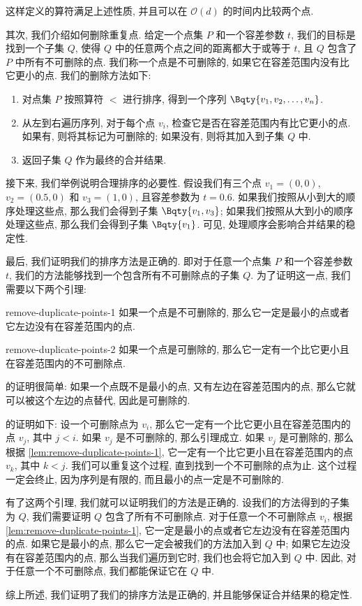 这样定义的算符满足上述性质, 并且可以在 $\mathcal{O}(d)$ 的时间内比较两个点.

其次, 我们介绍如何删除重复点.
给定一个点集 $P$ 和一个容差参数 $t$, 我们的目标是找到一个子集 $Q$, 使得 $Q$ 中的任意两个点之间的距离都大于或等于 $t$, 且 $Q$ 包含了 $P$ 中所有不可删除的点.
我们称一个点是不可删除的, 如果它在容差范围内没有比它更小的点.
我们的删除方法如下:
\begin{enumerate}
  \item 对点集 $P$ 按照算符 $<$ 进行排序, 得到一个序列 $\Bqty{v_1, v_2, \dots, v_n}$.
  \item 从左到右遍历序列, 对于每个点 $v_i$, 检查它是否在容差范围内有比它更小的点.
        如果有, 则将其标记为可删除的; 如果没有, 则将其加入到子集 $Q$ 中.
  \item 返回子集 $Q$ 作为最终的合并结果.
\end{enumerate}

接下来, 我们举例说明合理排序的必要性.
假设我们有三个点 $v_1 = (0, 0)$, $v_2 = (0.5, 0)$ 和 $v_3 = (1, 0)$, 且容差参数为 $t = 0.6$.
如果我们按照从小到大的顺序处理这些点, 那么我们会得到子集 $\Bqty{v_1, v_3}$; 如果我们按照从大到小的顺序处理这些点, 那么我们会得到子集 $\Bqty{v_1}$.
可见, 处理顺序会影响合并结果的稳定性.

最后, 我们证明我们的排序方法是正确的.
即对于任意一个点集 $P$ 和一个容差参数 $t$, 我们的方法能够找到一个包含所有不可删除点的子集 $Q$.
为了证明这一点, 我们需要以下两个引理:

\begin{lem}{}{remove-duplicate-points-1}
  如果一个点是不可删除的, 那么它一定是最小的点或者它左边没有在容差范围内的点.
\end{lem}

\begin{lem}{}{remove-duplicate-points-2}
  如果一个点是可删除的, 那么它一定有一个比它更小且在容差范围内的不可删除点.
\end{lem}

 的证明很简单:
如果一个点既不是最小的点, 又有左边在容差范围内的点, 那么它就可以被这个左边的点替代, 因此是可删除的.

 的证明如下:
设一个可删除点为 $v_i$, 那么它一定有一个比它更小且在容差范围内的点 $v_j$, 其中 $j < i$. 如果 $v_j$ 是不可删除的, 那么引理成立.
如果 $v_j$ 是可删除的, 那么根据 \cref{lem:remove-duplicate-points-1}, 它一定有一个比它更小且在容差范围内的点 $v_k$, 其中 $k < j$.
我们可以重复这个过程, 直到找到一个不可删除的点为止.
这个过程一定会终止, 因为序列是有限的, 而且最小的点一定是不可删除的.

有了这两个引理, 我们就可以证明我们的方法是正确的.
设我们的方法得到的子集为 $Q$, 我们需要证明 $Q$ 包含了所有不可删除点.
对于任意一个不可删除点 $v_i$, 根据 \cref{lem:remove-duplicate-points-1}, 它一定是最小的点或者它左边没有在容差范围内的点.
如果它是最小的点, 那么它一定会被我们的方法加入到 $Q$ 中; 如果它左边没有在容差范围内的点, 那么当我们遍历到它时, 我们也会将它加入到 $Q$ 中.
因此, 对于任意一个不可删除点, 我们都能保证它在 $Q$ 中.

综上所述, 我们证明了我们的排序方法是正确的, 并且能够保证合并结果的稳定性.
